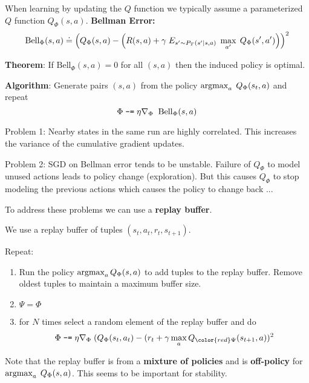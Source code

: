 {

When learning by updating the $Q$ function we typically assume a parameterized $Q$ function $Q_\Phi(s,a)$.
\vfill
{\bf Bellman Error:}
{\huge $$\mathrm{Bell}_\Phi(s,a) \doteq \left(Q_\Phi(s,a) - \left(R(s,a) + \gamma\;E_{s' \sim P_T(s'|s,a)}\;\max_{a'}\;Q_\Phi(s',a')\right)\right)^2$$}

{\bf Theorem}: If $\mathrm{Bell}_\Phi(s,a) = 0$ for all $(s,a)$ then the induced policy is optimal.

\vfill
{\bf Algorithm}: Generate pairs $(s,a)$ from the policy $\operatorname*{argmax}_a\;Q_\Phi(s_t,a)$ and repeat
$$\Phi \;\mbox{\tt -=}\; \eta \nabla_\Phi \;\; \mathrm{Bell}_\Phi(s,a)$$



Problem 1: Nearby states in the same run are highly correlated.  This increases the variance of the cumulative gradient updates.

\vfill
Problem 2: SGD on Bellman error tends to be unstable. Failure of $Q_\Phi$ to model unused actions leads to policy change (exploration).
But this causes $Q_\Phi$ to stop modeling the previous actions
which causes the policy to change back ...

\vfill
To address these problems we can use a {\bf replay buffer}.


We use a replay buffer of tuples $(s_t,a_t,r_t,s_{t+1})$.

\vfill
Repeat:

\vfill
\begin{enumerate}

\item Run the policy $\operatorname*{argmax}_a Q_\Phi(s,a)$ to add tuples to the replay buffer.  Remove oldest tuples to maintain a maximum buffer size.

\item {\color{red} $\Psi = \Phi$}
  
\item for $N$ times select a random element of the replay buffer and do
$$\Phi \;\minuseq \; \eta \nabla_\Phi\;(Q_\Phi(s_t,a_t) - (r_t + \gamma \max_{a} Q_{\color{red} \Psi}(s_{t+1},a))^2$$
\end{enumerate}


Note that the replay buffer is from a {\bf mixture of policies} and is {\bf off-policy} for $\operatorname*{argmax}_a\;Q_\Phi(s,a)$.  This seems to be important for stability.

}
